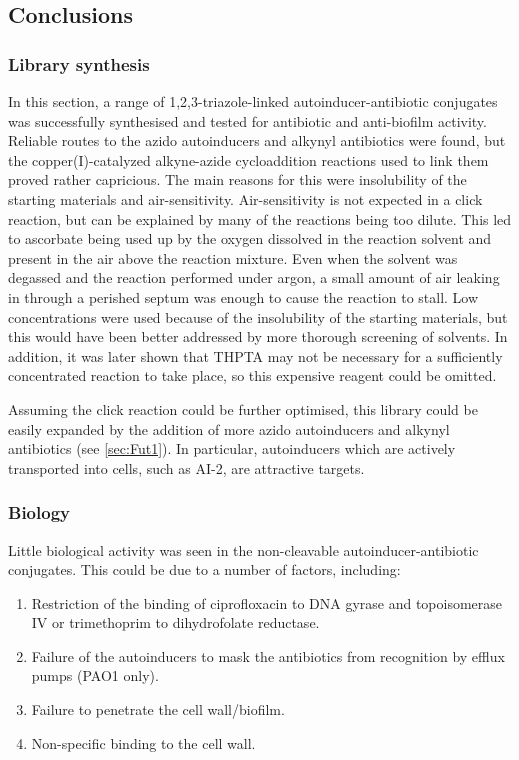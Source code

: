 \subsection{Conclusions}

\subsubsection{Library synthesis}

In this section, a range of 1,2,3-triazole-linked autoinducer-antibiotic conjugates was successfully synthesised and tested for antibiotic and anti-biofilm activity.
Reliable routes to the azido autoinducers and alkynyl antibiotics were found, but the copper(I)-catalyzed alkyne-azide cycloaddition reactions used to link them proved rather capricious.
The main reasons for this were insolubility of the starting materials and air-sensitivity. 
Air-sensitivity is not expected in a click reaction, but can be explained by many of the reactions being too dilute\cite{Hong2009}. 
This led to ascorbate being used up by the oxygen dissolved in the reaction solvent and present in the air above the reaction mixture. 
Even when the solvent was degassed and the reaction performed under argon, a small amount of air leaking in through a perished septum was enough to cause the reaction to stall.
Low concentrations were used because of the insolubility of the starting materials, but this would have been better addressed by more thorough screening of solvents.
In addition, it was later shown that THPTA may not be necessary for a sufficiently concentrated reaction to take place\cite{Stokes2017}, so this expensive reagent could be omitted.

Assuming the click reaction could be further optimised, this library could be easily expanded by the addition of more azido autoinducers and alkynyl antibiotics (see \ref{sec:Fut1}). In particular, autoinducers which are actively transported into cells, such as AI-2, are attractive targets.

\subsubsection{Biology}

Little biological activity was seen in the non-cleavable autoinducer-antibiotic conjugates. This could be due to a number of factors, including:

\begin{enumerate}
\item Restriction of the binding of ciprofloxacin to DNA gyrase and topoisomerase IV\cite{Drlica1997} or trimethoprim to dihydrofolate reductase\cite{Brogden1982}.

\item Failure of the autoinducers to mask the antibiotics from recognition by efflux pumps (PAO1 only).

\item Failure to penetrate the cell wall/biofilm.

\item Non-specific binding to the cell wall.
\end{enumerate}

